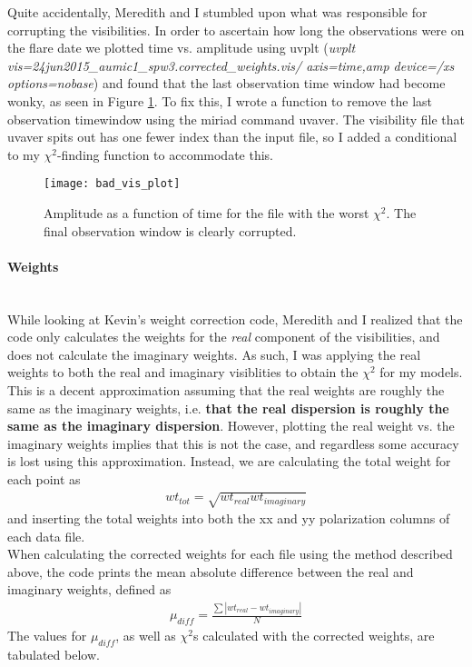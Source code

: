 \documentclass[a4paper]{tufte-handout}
\begin{document}
\hrulefill


Quite accidentally, Meredith and I stumbled upon what was responsible for corrupting the visibilities. In order to ascertain how long the observations were on the flare date we plotted time vs. amplitude using uvplt (\textit{uvplt vis=24jun2015\_aumic1\_spw3.corrected\_weights.vis/ axis=time,amp device=/xs options=nobase}) and found that the last observation time window had become wonky, as seen in Figure \ref{fig:bad_vis}. To fix this, I wrote a function to remove the last observation timewindow using the miriad command uvaver. The visibility file that uvaver spits out has one fewer index than the input file, so I added a conditional to my $\chi^2$-finding function to accommodate this.

\begin{figure}[!ht]
  \label{fig:bad_vis}
  \centering
  \caption{Amplitude as a function of time for the file with the worst $\chi^2$. The final observation window is clearly corrupted.}

  \texttt{[image: bad\_vis\_plot]}
\end{figure}


\hrulefill


\paragraph{Weights} \ \\
While looking at Kevin's weight correction code, Meredith and I realized that the code only calculates the weights for the \textit{real} component of the visibilities, and does not calculate the imaginary weights. As such, I was applying the real weights to both the real and imaginary visiblities to obtain the $\chi^2$ for my models. This is a decent approximation assuming that the real weights are roughly the same as the imaginary weights, i.e. \textbf{that the real dispersion is roughly the same as the imaginary dispersion}. However, plotting the real weight vs. the imaginary weights implies that this is not the case, and regardless some accuracy is lost using this approximation. Instead, we are calculating the total weight for each point as
\begin{align}
  \label{weight}
  wt_{tot} = \sqrt{wt_{real}wt_{imaginary}}
\end{align}
and inserting the total weights into both the xx and yy polarization columns of each data file.\\
When calculating the corrected weights for each file using the method described above, the code prints the mean absolute difference between the real and imaginary weights, defined as
\begin{align*}
  \mu_{diff} = \frac{\sum |wt_{real}-wt_{imaginary}|}{N}
\end{align*}
The values for $\mu_{diff}$, as well as $\chi^2$s calculated with the corrected weights, are tabulated below.
\end{document}
